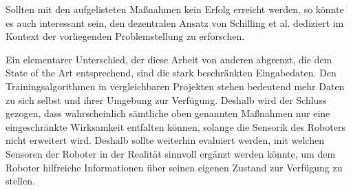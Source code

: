 Sollten mit den aufgelisteten Maßnahmen kein Erfolg erreicht werden, so könnte es auch interessant sein, den dezentralen Ansatz von Schilling et al. \cite{schilling2020decentralized} dediziert im Kontext der vorliegenden Problemstellung zu erforschen.

Ein elementarer Unterschied, der diese Arbeit von anderen abgrenzt, die dem State of the Art entsprechend, sind die stark beschränkten Eingabedaten.
Den Trainingsalgorithmen in vergleichbaren Projekten stehen bedeutend mehr Daten zu sich selbst und ihrer Umgebung zur Verfügung.
Deshalb wird der Schluss gezogen, dass wahrscheinlich sämtliche oben genannten Maßnahmen nur eine eingeschränkte Wirksamkeit entfalten können, solange die Sensorik des Roboters nicht erweitert wird.
Deshalb sollte weiterhin evaluiert werden, mit welchen Sensoren der Roboter in der Realität sinnvoll ergänzt werden könnte, um dem Roboter hilfreiche Informationen über seinen eigenen Zustand zur Verfügung zu stellen.
